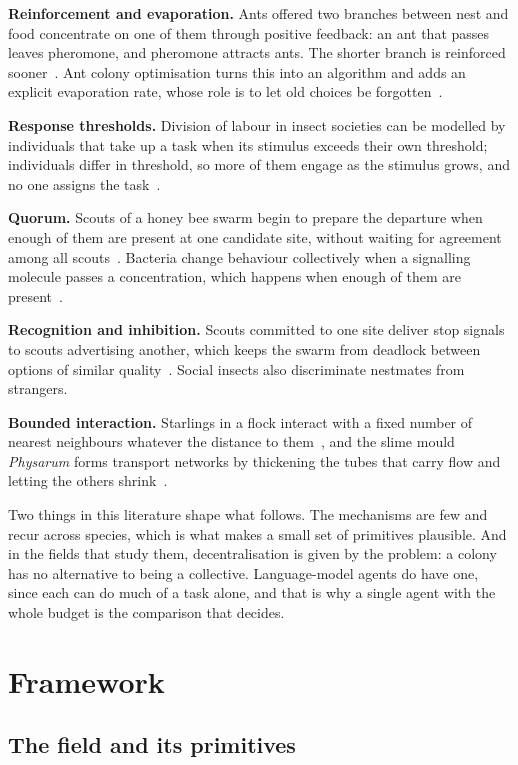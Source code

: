 \documentclass[10pt,twocolumn]{article}
\begin{document}
\textbf{Reinforcement and evaporation.} Ants offered two branches between nest and food concentrate on one of them through positive feedback: an ant that passes leaves pheromone, and pheromone attracts ants. The shorter branch is reinforced sooner~\cite{goss1989}. Ant colony optimisation turns this into an algorithm and adds an explicit evaporation rate, whose role is to let old choices be forgotten~\cite{dorigo1996}.

\textbf{Response thresholds.} Division of labour in insect societies can be modelled by individuals that take up a task when its stimulus exceeds their own threshold; individuals differ in threshold, so more of them engage as the stimulus grows, and no one assigns the task~\cite{bonabeau1996}.

\textbf{Quorum.} Scouts of a honey bee swarm begin to prepare the departure when enough of them are present at one candidate site, without waiting for agreement among all scouts~\cite{seeley2003}. Bacteria change behaviour collectively when a signalling molecule passes a concentration, which happens when enough of them are present~\cite{miller2001}.

\textbf{Recognition and inhibition.} Scouts committed to one site deliver stop signals to scouts advertising another, which keeps the swarm from deadlock between options of similar quality~\cite{seeley2012}. Social insects also discriminate nestmates from strangers.

\textbf{Bounded interaction.} Starlings in a flock interact with a fixed number of nearest neighbours whatever the distance to them~\cite{ballerini2008}, and the slime mould \emph{Physarum} forms transport networks by thickening the tubes that carry flow and letting the others shrink~\cite{tero2010}.

Two things in this literature shape what follows. The mechanisms are few and recur across species, which is what makes a small set of primitives plausible. And in the fields that study them, decentralisation is given by the problem: a colony has no alternative to being a collective. Language-model agents do have one, since each can do much of a task alone, and that is why a single agent with the whole budget is the comparison that decides.

\section{Framework}\label{sec:framework}

\subsection{The field and its primitives}
\end{document}
